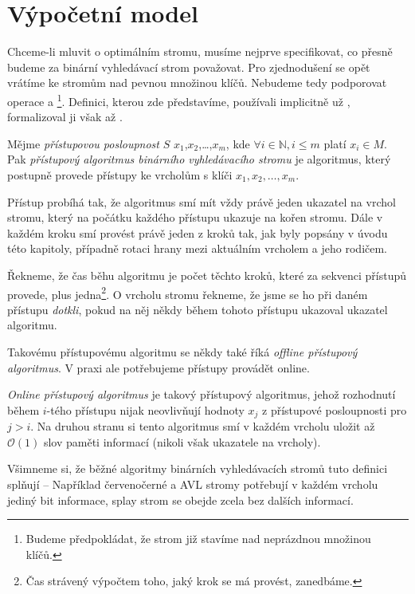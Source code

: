 \section{Výpočetní model}
Chceme-li mluvit o optimálním stromu, musíme nejprve specifikovat, co přesně
budeme za binární vyhledávací strom považovat. Pro zjednodušení se opět vrátíme
ke stromům nad pevnou množinou klíčů. Nebudeme tedy podporovat operace  a \footnote{Budeme předpokládat, že strom již stavíme nad neprázdnou množinou klíčů.}.
Definici, kterou zde
představíme, používali implicitně už \citet{splay}, formalizoval ji však až
\citet{tango}.


\begin{definice}
Mějme \emph{přístupovou posloupnost} $S$ $x_1$,$x_2$,\dots,$x_m$, kde $\forall i \in
\mathbb N, i\leq m$ platí $x_i\in M$. Pak \emph{přístupový algoritmus
binárního vyhledávacího stromu} je algoritmus, který postupně provede přístupy
ke vrcholům s klíči $x_1, x_2,\dots,x_m$.

Přístup probíhá tak, že algoritmus smí mít vždy právě jeden ukazatel na vrchol
stromu, který na počátku každého přístupu ukazuje na kořen stromu. Dále v
každém kroku smí provést právě jeden z kroků tak, jak byly popsány v úvodu této kapitoly, případně rotaci hrany mezi aktuálním vrcholem a jeho rodičem. 

Řekneme, že čas běhu algoritmu je počet těchto kroků, které za sekvenci
přístupů provede, plus jedna\footnote{Čas strávený výpočtem toho, jaký krok se má provést, zanedbáme.}. O vrcholu stromu řekneme, že jsme se ho při daném
přístupu \emph{dotkli}, pokud na něj někdy během tohoto přístupu ukazoval
ukazatel algoritmu.  \end{definice}

Takovému přístupovému algoritmu se někdy také říká \emph{offline přístupový
algoritmus}. V praxi ale potřebujeme přístupy provádět online.

\begin{definice}
\emph{Online přístupový algoritmus} je takový přístupový algoritmus, jehož
rozhodnutí během $i$-tého přístupu nijak neovlivňují hodnoty $x_j$ z přístupové
posloupnosti pro $j>i$. Na druhou stranu si tento algoritmus smí v každém
vrcholu uložit až $\mathcal O(1)$ slov paměti informací (nikoli však ukazatele
na vrcholy).
\end{definice}

Všimneme si, že běžné algoritmy binárních vyhledávacích stromů tuto definici
splňují -- Například červenočerné a AVL stromy potřebují v každém vrcholu
jediný bit informace, splay strom se obejde zcela bez dalších informací.

